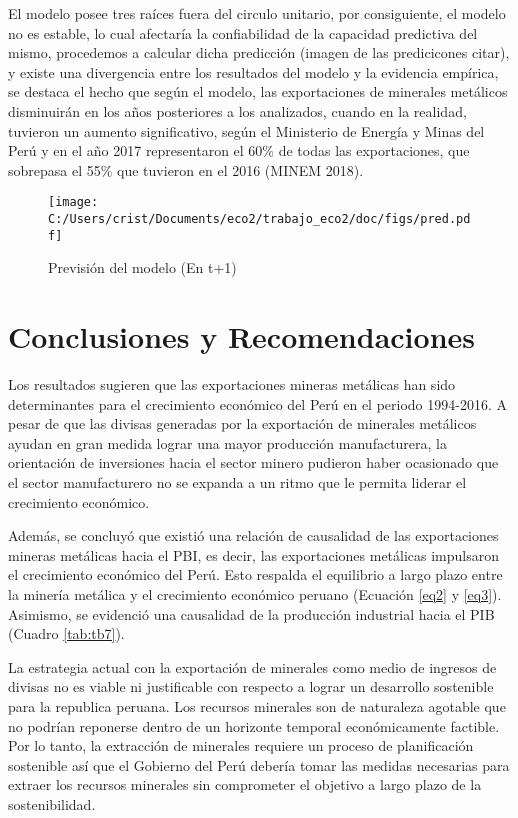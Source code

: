 \documentclass[11pt,]{article}
\begin{document}
El modelo posee tres raíces fuera del circulo unitario, por
consiguiente, el modelo no es estable, lo cual afectaría la
confiabilidad de la capacidad predictiva del mismo, procedemos a
calcular dicha predicción (imagen de las predicicones citar), y existe
una divergencia entre los resultados del modelo y la evidencia empírica,
se destaca el hecho que según el modelo, las exportaciones de minerales
metálicos disminuirán en los años posteriores a los analizados, cuando
en la realidad, tuvieron un aumento significativo, según el Ministerio
de Energía y Minas del Perú y en el año 2017 representaron el 60\% de
todas las exportaciones, que sobrepasa el 55\% que tuvieron en el 2016
(MINEM 2018).

\begin{figure}[h]
\centering
\texttt{[image: C:/Users/crist/Documents/eco2/trabajo\_eco2/doc/figs/pred.pdf]}
\caption{\label{fig:plot2} Previsión del modelo (En t+1)}
\end{figure}

\hypertarget{conclusiones}{%
\section{Conclusiones y Recomendaciones}\label{conclusiones}}

Los resultados sugieren que las exportaciones mineras metálicas han sido
determinantes para el crecimiento económico del Perú en el periodo
1994-2016. A pesar de que las divisas generadas por la exportación de
minerales metálicos ayudan en gran medida lograr una mayor producción
manufacturera, la orientación de inversiones hacia el sector minero
pudieron haber ocasionado que el sector manufacturero no se expanda a un
ritmo que le permita liderar el crecimiento económico.

Además, se concluyó que existió una relación de causalidad de las
exportaciones mineras metálicas hacia el PBI, es decir, las
exportaciones metálicas impulsaron el crecimiento económico del Perú.
Esto respalda el equilibrio a largo plazo entre la minería metálica y el
crecimiento económico peruano (Ecuación \ref{eq2} y \ref{eq3}).
Asimismo, se evidenció una causalidad de la producción industrial hacia
el PIB (Cuadro \ref{tab:tb7}).

La estrategia actual con la exportación de minerales como medio de
ingresos de divisas no es viable ni justificable con respecto a lograr
un desarrollo sostenible para la republica peruana. Los recursos
minerales son de naturaleza agotable que no podrían reponerse dentro de
un horizonte temporal económicamente factible. Por lo tanto, la
extracción de minerales requiere un proceso de planificación sostenible
así que el Gobierno del Perú debería tomar las medidas necesarias para
extraer los recursos minerales sin comprometer el objetivo a largo plazo
de la sostenibilidad.
\end{document}
